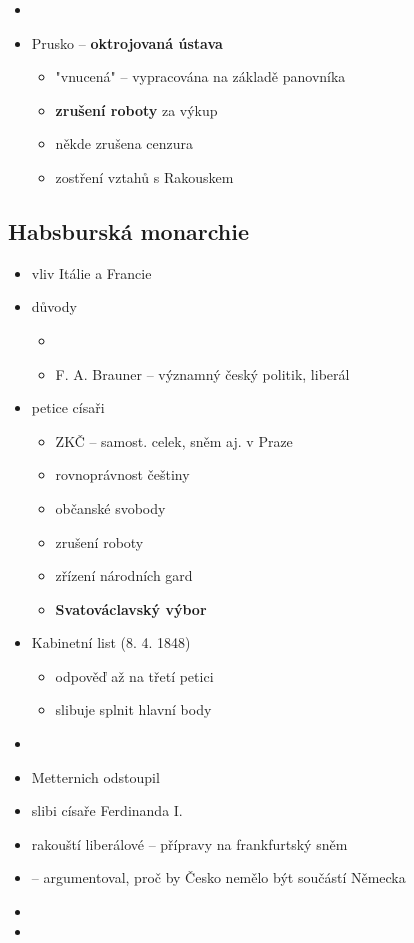 \begin{itemize}
\begin{itemize}
	\item {}
	\item Prusko -- \textbf{oktrojovaná ústava}
		\begin{itemize}
		\item "vnucená" -- vypracována na základě panovníka
		\item \textbf{zrušení roboty} za výkup
		\item někde zrušena cenzura
		\item zostření vztahů s Rakouskem
		\end{itemize}
	\end{itemize}
\end{itemize}

\subsection{Habsburská monarchie}
\begin{itemize}
\item vliv Itálie a Francie
\item důvody
	\begin{itemize}
	\item {}
	\item F. A. Brauner -- významný český politik, liberál
	\end{itemize}
\item petice císaři
	\begin{itemize}
	\item ZKČ -- samost. celek, sněm aj. v Praze
	\item rovnoprávnost češtiny
	\item občanské svobody
	\item zrušení roboty
	\item zřízení národních gard
	\item \textbf{Svatováclavský výbor}
	\end{itemize}
\item Kabinetní list (8. 4. 1848)
	\begin{itemize}
	\item odpověď až na třetí petici
	\item slibuje splnit hlavní body
	\end{itemize}
\item {}
\item Metternich odstoupil
\item slibi císaře Ferdinanda I.
\item rakouští liberálové -- přípravy na frankfurtský sněm
\item {} -- argumentoval, proč by Česko nemělo být součástí Německa
\item {}
\item {}
\end{itemize}

